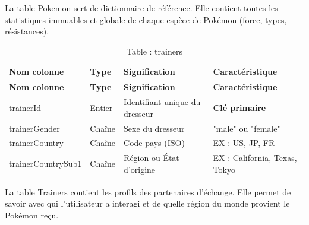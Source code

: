 \documentclass[mstat,12pt]{unswthesis}
\begin{document}
\smallskip

La table Pokemon sert de dictionnaire de référence. Elle contient toutes
les statistiques immuables et globale de chaque espèce de Pokémon
(force, types, résistances).

\bigskip

\begin{longtable}{|m{3.5cm}|m{1.5cm}|m{5cm}|m{5cm}|}
\caption{Table : trainers} \label{tab:trainers} \\
\hline
\textbf{Nom colonne} & \textbf{Type} & \textbf{Signification} & \textbf{Caractéristique} \\ \hline
\endfirsthead
\hline
\textbf{Nom colonne} & \textbf{Type} & \textbf{Signification} & \textbf{Caractéristique} \\ \hline
\endhead
trainerId & Entier & Identifiant unique du dresseur & \textbf{Clé primaire} \\ \hline
trainerGender & Chaîne & Sexe du dresseur & "male" ou "female" \\ \hline
trainerCountry & Chaîne & Code pays (ISO) & EX : US, JP, FR \\ \hline
trainerCountrySub1 & Chaîne & Région ou État d'origine & EX : California, Texas, Tokyo \\ \hline
\end{longtable}

\smallskip

La table Trainers contient les profils des partenaires d'échange. Elle
permet de savoir avec qui l'utilisateur a interagi et de quelle région
du monde provient le Pokémon reçu.

\bigskip
\end{document}
